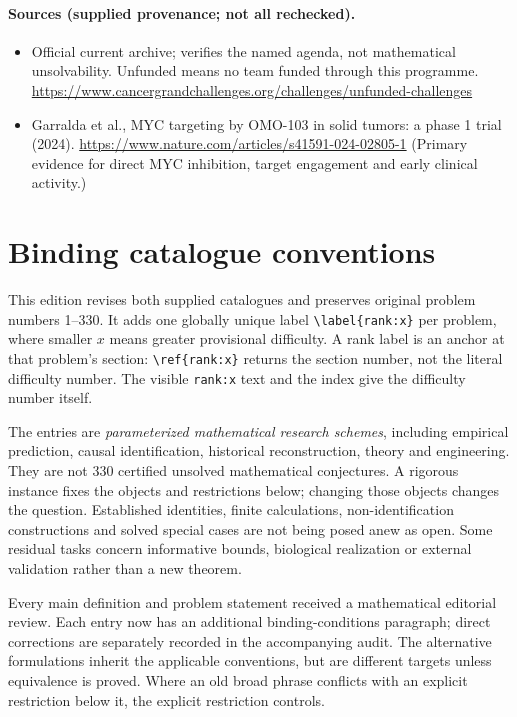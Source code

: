 \documentclass[11pt]{article}
\begin{document}
\paragraph{Sources (supplied provenance; not all rechecked).} \begin{itemize}
\item Official current archive; verifies the named agenda, not mathematical unsolvability. Unfunded means no team funded through this programme. \url{https://www.cancergrandchallenges.org/challenges/unfunded-challenges}
\item Garralda et al., MYC targeting by OMO-103 in solid tumors: a phase 1 trial (2024). \url{https://www.nature.com/articles/s41591-024-02805-1} (Primary evidence for direct MYC inhibition, target engagement and early clinical activity.)
\end{itemize}


\section*{Binding catalogue conventions}
This edition revises both supplied catalogues and preserves original problem numbers 1--330. It adds one globally unique label \verb|\label{rank:x}| per problem, where smaller $x$ means greater provisional difficulty. A rank label is an anchor at that problem's section: \verb|\ref{rank:x}| returns the section number, not the literal difficulty number. The visible \texttt{rank:x} text and the index give the difficulty number itself.

The entries are \emph{parameterized mathematical research schemes}, including empirical prediction, causal identification, historical reconstruction, theory and engineering. They are not 330 certified unsolved mathematical conjectures. A rigorous instance fixes the objects and restrictions below; changing those objects changes the question. Established identities, finite calculations, non-identification constructions and solved special cases are not being posed anew as open. Some residual tasks concern informative bounds, biological realization or external validation rather than a new theorem.

Every main definition and problem statement received a mathematical editorial review. Each entry now has an additional binding-conditions paragraph; direct corrections are separately recorded in the accompanying audit. The alternative formulations inherit the applicable conventions, but are different targets unless equivalence is proved. Where an old broad phrase conflicts with an explicit restriction below it, the explicit restriction controls.
\end{document}
